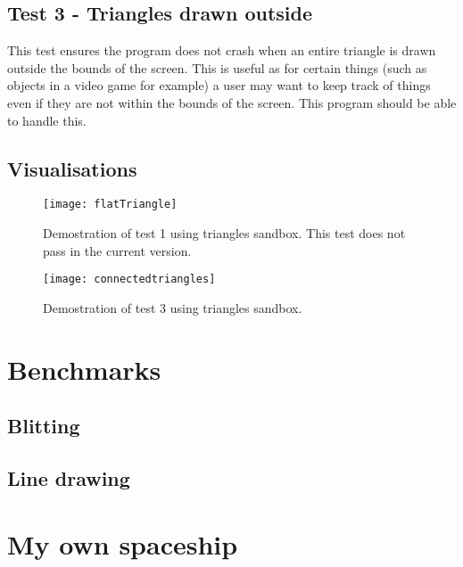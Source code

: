 \documentclass[
	letterpaper, %
	10pt, %
]{CSUniSchoolLabReport}
\begin{document}
\subsection*{Test 3 {-} Triangles drawn outside}
This test ensures the program does not crash when an entire triangle is drawn outside the bounds of 
the screen. This is useful as for certain things (such as objects in a video game for example) a user 
may want to keep track of things even if they are not within the bounds of the screen. This program 
should be able to handle this.
\subsection*{Visualisations}
\begin{figure}[H]
	\centering
	\begin{minipage}[b]{0.4\textwidth}
		\texttt{[image: flatTriangle]}
		\caption{Demostration of test 1 using triangles sandbox. This test does not pass in the current version.}
	\end{minipage}
	\hfill
	\begin{minipage}[b]{0.4\textwidth}
		\texttt{[image: connectedtriangles]}
		\caption{Demostration of test 3 using triangles sandbox.}
  	\end{minipage}
\end{figure}
\section{Benchmarks}
\subsection{Blitting}

\subsection{Line drawing}

\section{My own spaceship}

\subsection*{}

\printbibliography%

\end{document}
